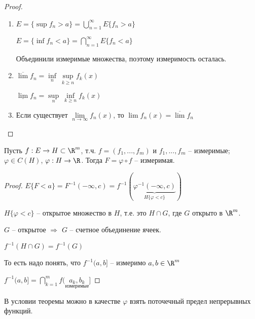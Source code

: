 \begin{proof}~
    \begin{enumerate}
        \item $E=\{\sup f_n > a\}=\bigcup\limits_{n=1}^\infty E\{f_n > a\}$
        
        
        $E=\{\inf f_n < a\}=\bigcap\limits_{n=1}^\infty E\{f_n < a\}$

        Объединили измеримые множества, поэтому измеримость осталась.

        \item $\overline{\lim} f_n =\underset{n}{\inf}\ \underset{k\geq n}{\sup} f_k(x)$
        
        $\underline{\lim} f_n =\underset{n}{\sup}\ \underset{k\geq n}{\inf} f_k(x)$

        \item Если существует $\lim\limits_{n\rightarrow \infty} f_n(x)$, то $\lim f_n(x) =\overline{\lim} f_n$
    \end{enumerate}
\end{proof}

\begin{theorem}
    Пусть $f:E\rightarrow H \subset \R^m$, т.ч. $f=(f_1, ..., f_m)$ и $f_1, ..., f_m$ – измеримые;
    $\varphi \in C(H)$, $\varphi: H \rightarrow \R$. Тогда $F=\varphi \circ f$ – измеримая.
\end{theorem}

\begin{proof}
    $E\{F < a\}= F^{-1}(-\infty, c)= f^{-1}(\underbrace{\varphi^{-1}(-\infty, c)}_{H\{\varphi < c\}})$

    $H\{\varphi < c\}$ – открытое множество в $H$, т.е. это $H\cap G$, где $G$ 
    открыто в $\R^m$.

    $G$ – открытое $\Rightarrow$ $G$ – счетное объединение ячеек.

    $f^{-1}(H\cap G)= f^{-1}(G)$

    То есть надо понять, что $f^{-1}(a, b]$ – измеримо $a, b\in \R^m$

    $f^{-1}(a, b]=\bigcap\limits_{k=1}^m f(\underset{\text{измеримые}}{a_k, b_k}]$
\end{proof}

\begin{corollary}
    В условии теоремы можно в качестве $\varphi$ взять поточечный предел
    непрерывных функций.
\end{corollary}

